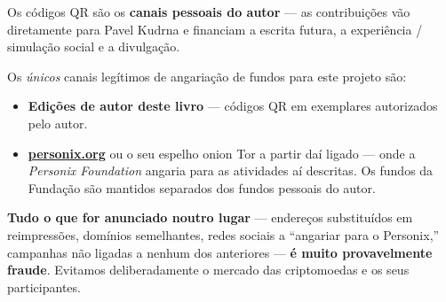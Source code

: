 \begin{minipage}[t]{0.60\textwidth}
\vspace{0pt}
\begin{mdframed}[
  linewidth=0.7pt,roundcorner=5pt,
  innerleftmargin=10pt,innerrightmargin=10pt,
  innertopmargin=8pt,innerbottommargin=8pt,
  skipabove=0pt,skipbelow=0pt,
  linecolor=cbwarning!50,backgroundcolor=cbwarning!5,
  nobreak=true,
  needspace=4\baselineskip,
]
\footnotesize
Os códigos QR são os \textbf{canais pessoais do autor} --- as contribuições vão diretamente para Pavel Kudrna e financiam a escrita futura, a experiência / simulação social e a divulgação.

\smallskip
Os \emph{únicos} canais legítimos de angariação de fundos para este projeto são:

\smallskip
\begin{itemize}
\setlength{\itemsep}{0pt}
\setlength{\topsep}{0pt}
\item \textbf{Edições de autor deste livro} --- códigos QR em exemplares autorizados pelo autor.
\item \href{https://personix.org}{\textbf{personix.org}} ou o seu espelho onion Tor a partir daí ligado --- onde a \emph{Personix Foundation} angaria para as atividades aí descritas. Os fundos da Fundação são mantidos separados dos fundos pessoais do autor.
\end{itemize}

\smallskip
\textbf{Tudo o que for anunciado noutro lugar} --- endereços substituídos em reimpressões, domínios semelhantes, redes sociais a ``angariar para o Personix,'' campanhas não ligadas a nenhum dos anteriores --- \textbf{é muito provavelmente fraude}. Evitamos deliberadamente o mercado das criptomoedas e os seus participantes.
\end{mdframed}
\end{minipage}

\clearpage
